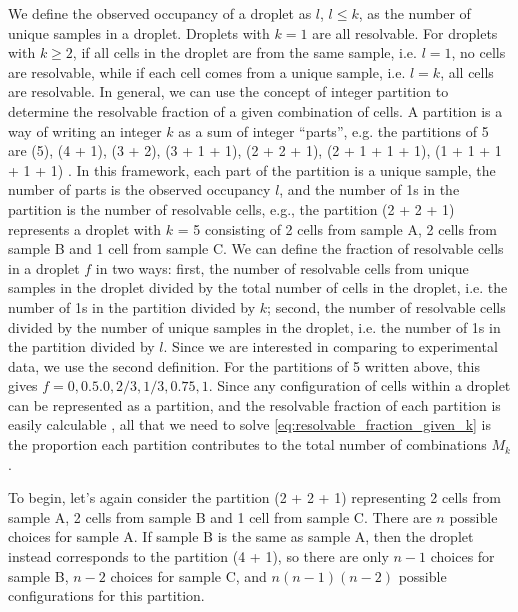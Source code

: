 \documentclass[unnumsec,webpdf,modern,large]{oup-authoring-template}
\begin{document}
	We define the observed occupancy of a droplet as $l$, $l \leq k$, as the number of unique samples in a droplet.
	Droplets with $k = 1$ are all resolvable.   
	For droplets with $k \geq 2$, if all cells in the droplet are from the same sample, i.e. $l=1$, no cells are resolvable, while if each cell comes from a unique sample, i.e. $l = k$, all cells are resolvable. 
	In general, we can use the concept of integer partition to determine the resolvable fraction of a given combination of cells.
	A partition is a way of writing an integer $k$ as a sum of integer ``parts'', e.g. the partitions of 5 are (5), (4 + 1), (3 + 2), (3 + 1 + 1), (2 + 2 + 1), (2 + 1 + 1 + 1), (1 + 1 + 1 + 1 + 1)
	\citep{Andrews1998}.
	In this framework, each part of the partition is a unique sample, the number of parts is the observed occupancy $l$, and the number of 1s in the partition is the number of resolvable cells, e.g., the partition (2 + 2 + 1) represents a droplet with $k$ = 5 consisting of 2 cells from sample A, 2 cells from sample B and 1 cell from sample C.
	We can define the fraction of resolvable cells in a droplet $f$ in two ways: first, the number of resolvable cells from unique samples in the droplet divided by the total number of cells in the droplet, i.e. the number of 1s in the partition divided by $k$; second, the number of resolvable cells divided by the number of unique samples in the droplet, i.e. the number of 1s in the partition divided by $l$. 
	Since we are interested in comparing to experimental data, we use the second definition.
	For the partitions of 5 written above, this gives $f = 0, 0.5. 0, 2/3, 1/3, 0.75, 1$.
	Since any configuration of cells within a droplet can be represented as a partition, and the resolvable fraction of each partition is easily calculable
	\citep{Andrews1998},
	 all that we need to solve \eqref{eq:resolvable_fraction_given_k} is the proportion each partition contributes to the total number of combinations $M_k$.
	 
	To begin, let's again consider the partition (2 + 2 + 1) representing 2 cells from sample A, 2 cells from sample B and 1 cell from sample C.
	There are $n$ possible choices for sample A. 
	If sample B is the same as sample A, then the droplet instead corresponds to the partition (4 + 1), so there are only $n-1$ choices for sample B, $n-2$ choices for sample C, and $n(n-1)(n-2)$ possible configurations for this partition. 
	
\end{document}
